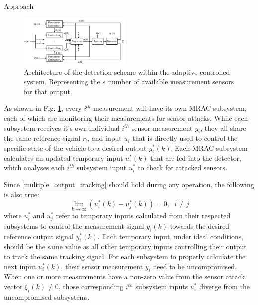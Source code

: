 \begin{section}{Approach}
\begin{figure}[ht!]
\vspace{1pt}
\centering
\includegraphics[width=0.48\textwidth]{con_and_det.png}
\caption{Architecture of the detection scheme within the adaptive controlled system. Representing  the $s$ number of available measurement sensors for that output.}
\label{fig:det_arch}
\end{figure}

As shown in Fig. \ref{fig:det_arch}, every $i^{th}$ measurement will have its own MRAC subsystem, each of which are monitoring their measurements for sensor attacks. While each subsystem receives it's own individual $i^{th}$ sensor measurement $y_i$, they all share the same reference signal $r_i$, and input $u_i$ that is directly used to control the specific state of the vehicle to a desired output $y_i^*(k)$. Each MRAC subsystem calculates an updated temporary input $u^*_i(k)$ that are fed into the detector, which analyses each $i^{th}$ subsystem input $u^*_i$ to check for attacked sensors.

Since \eqref{multiple_output_tracking} should hold during any operation, the following is also true:
\begin{equation}
    \lim_{k\to\infty}(u^*_i(k)-u^*_j(k))=0, \text{ }i\neq j
\end{equation}
where $u^*_i$ and $u^*_j$ refer to temporary inputs calculated from their respected subsystems to control the measurement signal $y_i(k)$ towards the desired reference output signal $y_i^*(k)$. Each temporary input, under ideal conditions, should be the same value as all other temporary inputs controlling their output to track the same tracking signal. For each subsystem to properly calculate the next input $u^*_i(k)$, their sensor measurement $y_i$ need to be uncompromised. When one or more measurements have a non-zero value from the sensor attack vector $\xi_i(k) \neq 0$, those corresponding $i^{th}$ subsystem inputs $u^*_i$ diverge from the uncompromised subsystems.


\end{section}
